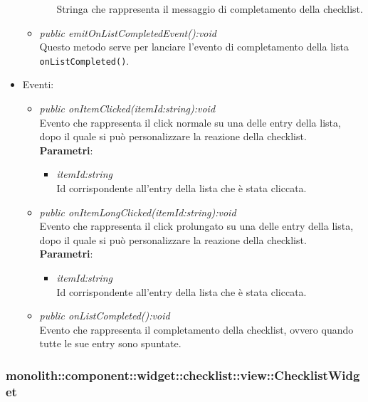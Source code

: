 \begin{itemize}
\begin{itemize}
\begin{itemize}
		Stringa che rappresenta il messaggio di completamento della checklist.
		\end{itemize} 
	\item \textit{public emitOnListCompletedEvent():void}\\
	Questo metodo serve per lanciare l'evento di completamento della lista \texttt{onListCompleted()}.
	\end{itemize}
\item{Eventi}:
	\begin{itemize}
	\item \textit{public onItemClicked(itemId:string):void}\\
	Evento che rappresenta il click normale su una delle entry della lista, dopo il quale si può personalizzare la reazione della checklist.
		\\ \textbf{Parametri}: \begin{itemize}
		\item \textit{itemId:string}\\
		Id corrispondente all'entry della lista che è stata cliccata.
		\end{itemize} 
	\item \textit{public onItemLongClicked(itemId:string):void}\\
	Evento che rappresenta il click prolungato su una delle entry della lista, dopo il quale si può personalizzare la reazione della checklist.
		\\ \textbf{Parametri}: \begin{itemize}
		\item \textit{itemId:string}\\
		Id corrispondente all'entry della lista che è stata cliccata.
		\end{itemize} 
	\item \textit{public onListCompleted():void}\\
	Evento che rappresenta il completamento della checklist, ovvero quando tutte le sue entry sono spuntate.
	\end{itemize}
\end{itemize}

\subsubsection{monolith::component::widget::checklist::view::ChecklistWidget}

